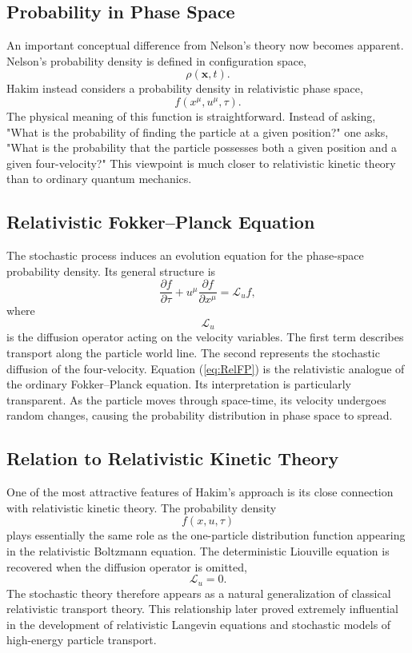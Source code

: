 \subsection{Probability in Phase Space}
An important conceptual difference from Nelson's theory now becomes
apparent.
Nelson's probability density is defined in configuration space,
\[\rho(\mathbf x,t).\]
Hakim instead considers a probability density in relativistic phase
space,
\[f(x^\mu,u^\mu,\tau).\]
The physical meaning of this function is straightforward.
Instead of asking,
"What is the probability of finding the particle at a given position?"
one asks,
"What is the probability that the particle possesses both a given
position and a given four-velocity?"
This viewpoint is much closer to relativistic kinetic theory than to
ordinary quantum mechanics.
\subsection{Relativistic Fokker--Planck Equation}
The stochastic process induces an evolution equation for the phase-space
probability density.
Its general structure is
\begin{equation}
\frac{\partial f}{\partial\tau}+u^\mu\frac{\partial f}{\partial x^\mu}=
    \mathcal L_u f,
\label{eq:RelFP}
\end{equation}
where
\[\mathcal L_u\]
is the diffusion operator acting on the velocity variables.
The first term describes transport along the particle world line.
The second represents the stochastic diffusion of the four-velocity.
Equation (\ref{eq:RelFP}) is the relativistic analogue of the ordinary
Fokker--Planck equation.
Its interpretation is particularly transparent.
As the particle moves through space-time, its velocity undergoes random
changes, causing the probability distribution in phase space to spread.
\subsection{Relation to Relativistic Kinetic Theory}
One of the most attractive features of Hakim's approach is its close
connection with relativistic kinetic theory.
The probability density
\[f(x,u,\tau)\]
plays essentially the same role as the one-particle distribution
function appearing in the relativistic Boltzmann equation.
The deterministic Liouville equation is recovered when the diffusion
operator is omitted,
\[\mathcal L_u=0.\]
The stochastic theory therefore appears as a natural generalization of
classical relativistic transport theory.
This relationship later proved extremely influential in the development
of relativistic Langevin equations and stochastic models of high-energy
particle transport.
